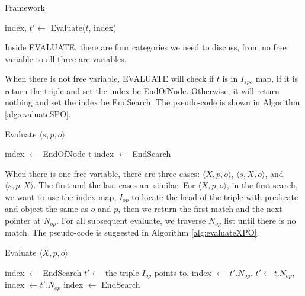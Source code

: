 \documentclass{article}
\begin{document}
\begin{enumerate}
\begin{enumerate}
\begin{algorithm}[H]
\caption{Framework}\label{alg:evaluate}
\begin{algorithmic}

\State index, $t' \leftarrow$ Evaluate($t$, index)
\EndWhile

\end{algorithmic}
\end{algorithm}

Inside EVALUATE, there are four categories we need to discuss, from no free variable to all three are variables. 

When there is not free variable, EVALUATE will check if $t$ is in $I_{spo}$ map, if it is return the triple and set the index be EndOfNode. Otherwise, it will return nothing and set the index be EndSearch. The pseudo-code is shown in Algorithm \eqref{alg:evaluateSPO}. 

\begin{algorithm}[H]
\caption{Evaluate $\langle s, p, o\rangle$}\label{alg:evaluateSPO}
\begin{algorithmic}
\State index $\leftarrow$ EndOfNode
\State \Return t
\Else
\State index $\leftarrow$ EndSearch 
\EndIf
\end{algorithmic}
\end{algorithm}

When there is one free variable, there are three cases: $\langle X, p, o\rangle$, $\langle s, X, o\rangle$, and $\langle s, p, X\rangle$. The first and the last cases are similar. For $\langle X, p, o\rangle$, in the first search, we want to use the index map, $I_{op}$ to locate the head of the triple with predicate and object the same as $o$ and $p$, then we return the first match and the next pointer at $N_{op}$. For all subsequent evaluate, we traverse $N_{op}$ list until there is no match. The pseudo-code is suggested in Algorithm \eqref{alg:evaluateXPO}.
 
\begin{algorithm}[H]
\caption{Evaluate $\langle X, p, o\rangle$}\label{alg:evaluateXPO}
\begin{algorithmic}
\State index $\leftarrow$ EndSearch
\EndIf
{} 
\State $t'\leftarrow$ the triple $I_{op}$ points to, index $\leftarrow$ $t'.N_{op}$.
\Else{}
\State $t'\leftarrow t.N_{op}$, index $\leftarrow t'.N_{op}$
\EndIf
{}
\State index $\leftarrow$ EndSearch
\EndIf
\end{algorithmic}
\end{algorithm}


\end{enumerate}
\end{enumerate}
\end{document}

